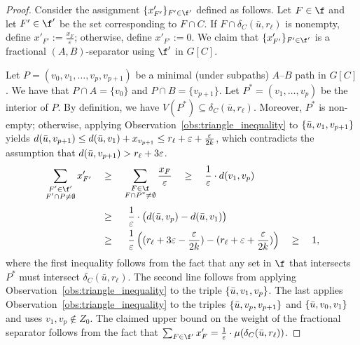 \begin{proof}
    Consider the assignment $\{x'_{F'}\}_{F' \in \f'}$ defined as follows. Let $F \in \f$ and let $F'\in\f'$ be the set corresponding to $F\cap C$. If $F \cap \delta_C(\bar{u}, r_\ell)$ is nonempty, define $x'_{F'} := \frac{x_F}{\varepsilon}$; otherwise, define $x'_{F'} := 0$. We claim that $\{x'_{F'}\}_{F' \in \f'}$ is a fractional $(A, B)$-separator using $\f'$ in $G[C]$.

    Let $P= (v_0,v_1, \dots, v_p,v_{p+1})$ be a minimal (under subpaths) $A$--$B$ path in $G[C]$. We have that $P\cap A = \{v_0\}$ and $P\cap B = \{v_{p+1}\}$. Let $P^*=(v_1, \dots, v_p)$ be the interior of $P$. By definition, we have $V(P^*) \subseteq \delta_C(\bar{u}, r_\ell)$. Moreover, $P^*$ is non-empty; otherwise, applying Observation~\ref{obs:triangle_inequality} to $\{\Bar{u}, v_1, v_{p+1}\}$ yields $d(\Bar{u}, v_{p+1}) \leq d(\Bar{u}, v_{1}) + x_{v_{p+1}} \leq r_\ell + \varepsilon + \frac{\varepsilon}{2k}$, which contradicts the assumption that $d(\Bar{u}, v_{p+1}) > r_\ell + 3\varepsilon$. 
    $$
    \begin{aligned}
        \sum_{\substack{F' \in \f'\\ F'\cap P\neq \emptyset}} x'_{F'} \quad 
        & \ge \quad \sum_{\substack{F \in \f \\ F \cap P^* \neq \emptyset}} \frac{x_{F}}{\varepsilon}
        \quad \ge \quad \frac{1}{\varepsilon}\cdot d(v_1,v_{p}) \\[2pt]
        & \ge\ \quad \frac{1}{\varepsilon}\cdot \bigl(d(\Bar{u},v_{p})-d(\Bar{u},v_1)\bigr) \\
        & \ge\ \quad \frac{1}{\varepsilon} \left((r_\ell + 3\varepsilon - \frac{\varepsilon}{2k}) - (r_\ell + \varepsilon + \frac{\varepsilon}{2k})\right)
        \quad \ge \quad 1,
    \end{aligned}
    $$
    where the first inequality follows from the fact that any set in $\f$ that intersects $P^*$ must intersect $\delta_C(\bar{u}, r_\ell)$. The second line follows from applying Observation~\ref{obs:triangle_inequality} to the triple $\{\Bar{u}, v_1, v_{p}\}$. The last applies Observation~\ref{obs:triangle_inequality} to the triples $\{\Bar{u}, v_{p}, v_{p+1}\}$ and $\{\Bar{u},v_0,v_1\}$ and uses $v_{1}, v_{p}\not\in Z_0$. The claimed upper bound on the weight of the fractional separator follows from the fact that $\sum_{F \in \f'} x'_{F}  = \frac{1}{\varepsilon}\cdot\mu(\delta_C(\Bar{u}, r_\ell))$.
\end{proof}


